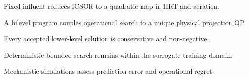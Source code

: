 \documentclass[a4paper,fleqn]{cas-sc}
\title[mode=title]{}
\author{}
\begin{document}
\begin{highlights}
\item Fixed influent reduces ICSOR to a quadratic map in HRT and aeration.
\item A bilevel program couples operational search to a unique physical projection QP.
\item Every accepted lower-level solution is conservative and non-negative.
\item Deterministic bounded search remains within the surrogate training domain.
\item Mechanistic simulations assess prediction error and operational regret.
\end{highlights}

\thispagestyle{empty}
\unvbox\casauhlbox
\end{document}
